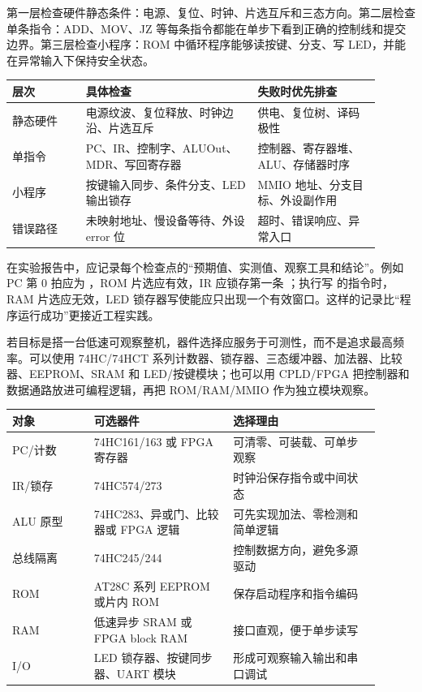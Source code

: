 第一层检查硬件静态条件：电源、复位、时钟、片选互斥和三态方向。第二层检查单条指令：ADD、MOV、JZ 等每条指令都能在单步下看到正确的控制线和提交边界。第三层检查小程序：ROM 中循环程序能够读按键、分支、写 LED，并能在异常输入下保持安全状态。

\begin{longtable}{L{0.18\linewidth}L{0.42\linewidth}L{0.3\linewidth}}
\toprule
层次 & 具体检查 & 失败时优先排查 \\
\midrule
静态硬件 & 电源纹波、复位释放、时钟边沿、片选互斥 & 供电、复位树、译码极性 \\
单指令 & PC、IR、控制字、ALUOut、MDR、写回寄存器 & 控制器、寄存器堆、ALU、存储器时序 \\
小程序 & 按键输入同步、条件分支、LED 输出锁存 & MMIO 地址、分支目标、外设副作用 \\
错误路径 & 未映射地址、慢设备等待、外设 error 位 & 超时、错误响应、异常入口 \\
\bottomrule
\end{longtable}

在实验报告中，应记录每个检查点的“预期值、实测值、观察工具和结论”。例如 PC 第 0 拍应为 ，ROM 片选应有效，IR 应锁存第一条 ；执行写  的指令时，RAM 片选应无效，LED 锁存器写使能应只出现一个有效窗口。这样的记录比“程序运行成功”更接近工程实践。

若目标是搭一台低速可观察整机，器件选择应服务于可测性，而不是追求最高频率。可以使用 74HC/74HCT 系列计数器、锁存器、三态缓冲器、加法器、比较器、EEPROM、SRAM 和 LED/按键模块；也可以用 CPLD/FPGA 把控制器和数据通路放进可编程逻辑，再把 ROM/RAM/MMIO 作为独立模块观察。

\begin{longtable}{L{0.2\linewidth}L{0.34\linewidth}L{0.36\linewidth}}
\toprule
对象 & 可选器件 & 选择理由 \\
\midrule
PC/计数 & 74HC161/163 或 FPGA 寄存器 & 可清零、可装载、可单步观察 \\
IR/锁存 & 74HC574/273 & 时钟沿保存指令或中间状态 \\
ALU 原型 & 74HC283、异或门、比较器或 FPGA 逻辑 & 可先实现加法、零检测和简单逻辑 \\
总线隔离 & 74HC245/244 & 控制数据方向，避免多源驱动 \\
ROM & AT28C 系列 EEPROM 或片内 ROM & 保存启动程序和指令编码 \\
RAM & 低速异步 SRAM 或 FPGA block RAM & 接口直观，便于单步读写 \\
I/O & LED 锁存器、按键同步器、UART 模块 & 形成可观察输入输出和串口调试 \\
\bottomrule
\end{longtable}

